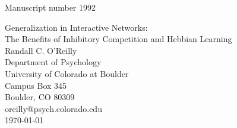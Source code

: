 \documentclass[12pt,twoside]{article}
\def\myheading{ Generalization in Interactive Networks }
\begin{document}


\raggedbottom
\sloppy

\pagestyle{empty}
\hfill Manuscript number 1992\\
\vspace*{.1in}
\begin{center}
  {\Large Generalization in Interactive Networks: \\The Benefits of
Inhibitory Competition and Hebbian Learning\\}
\vspace*{1in}
{\large Randall C. O'Reilly}\\
\vspace*{.5in}
{\large Department of Psychology\\
University of Colorado at Boulder \\
Campus Box 345\\
Boulder, CO 80309}\\
{\small oreilly@psych.colorado.edu}\\
\vspace*{1in}
\today\\
\vspace*{.5in}
\end{center}

\newpage
\end{document}
